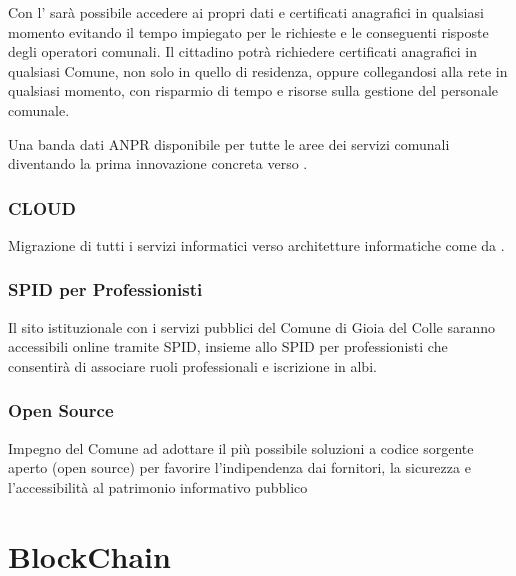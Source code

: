 \documentclass[a4paper,14pt,italian]{sphinxmanual}
\begin{document}
Con l’ sarà possibile accedere ai propri dati e certificati anagrafici in qualsiasi momento evitando il tempo impiegato per le richieste e le conseguenti risposte degli operatori comunali. Il cittadino potrà richiedere certificati anagrafici in qualsiasi Comune, non solo in quello di residenza, oppure collegandosi alla rete in qualsiasi momento, con risparmio di tempo e risorse sulla gestione del personale comunale.

Una banda dati ANPR disponibile per tutte le aree dei servizi comunali diventando la prima innovazione concreta verso .


\subsubsection{CLOUD}
\label{\detokenize{digitale:cloud}}
Migrazione di tutti i servizi informatici verso architetture informatiche  come da .


\subsubsection{SPID per Professionisti}
\label{\detokenize{digitale:spid-per-professionisti}}
Il sito istituzionale con i servizi pubblici del Comune di Gioia del Colle saranno accessibili online tramite SPID, insieme allo SPID per professionisti che consentirà di associare ruoli professionali e iscrizione in albi.


\subsubsection{Open Source}
\label{\detokenize{digitale:open-source}}
Impegno del Comune ad adottare il più possibile soluzioni a codice sorgente aperto (open source) per favorire l’indipendenza dai fornitori, la sicurezza e l’accessibilità al patrimonio informativo pubblico


\section{BlockChain}
\label{\detokenize{digitale:blockchain}}
\end{document}

